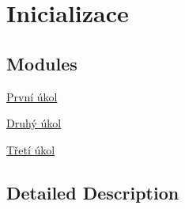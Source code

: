 \hypertarget{group__init}{}\section{Inicializace}
\label{group__init}
\subsection*{Modules}
\begin{DoxyCompactItemize}
\item 
\hyperlink{group__task1}{První úkol}
\item 
\hyperlink{group__task2}{Druhý úkol}
\item 
\hyperlink{group__task3}{Třetí úkol}
\end{DoxyCompactItemize}


\subsection{Detailed Description}
